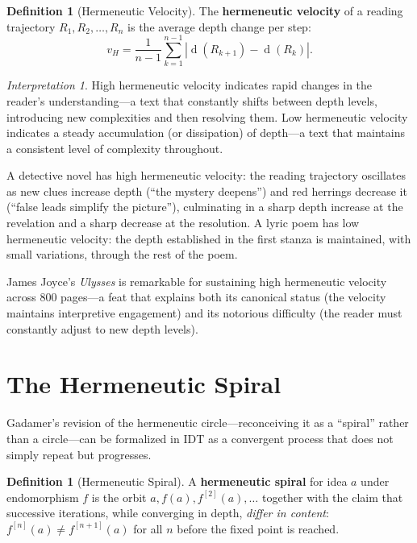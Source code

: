 \documentclass[11pt,openany]{book}
\theoremstyle{definition}
\newtheorem{definition}[axiom]{Definition}
\theoremstyle{plain}
\theoremstyle{remark}
\newtheorem{interpretation}[axiom]{Interpretation}
\newcommand{\depth}{\operatorname{d}}       %
\begin{document}
\begin{definition}[Hermeneutic Velocity]
The \textbf{hermeneutic velocity} of a reading trajectory $R_1, R_2, \ldots, R_n$ is the average depth change per step:
\[
v_H = \frac{1}{n-1} \sum_{k=1}^{n-1} |\depth(R_{k+1}) - \depth(R_k)|.
\]
\end{definition}

\begin{interpretation}
High hermeneutic velocity indicates rapid changes in the reader's understanding---a text that constantly shifts between depth levels, introducing new complexities and then resolving them. Low hermeneutic velocity indicates a steady accumulation (or dissipation) of depth---a text that maintains a consistent level of complexity throughout.

A detective novel has high hermeneutic velocity: the reading trajectory oscillates as new clues increase depth (``the mystery deepens'') and red herrings decrease it (``false leads simplify the picture''), culminating in a sharp depth increase at the revelation and a sharp decrease at the resolution. A lyric poem has low hermeneutic velocity: the depth established in the first stanza is maintained, with small variations, through the rest of the poem.

James Joyce's \emph{Ulysses} is remarkable for sustaining high hermeneutic velocity across 800 pages---a feat that explains both its canonical status (the velocity maintains interpretive engagement) and its notorious difficulty (the reader must constantly adjust to new depth levels).
\end{interpretation}

\section{The Hermeneutic Spiral}

Gadamer's revision of the hermeneutic circle---reconceiving it as a ``spiral'' rather than a circle---can be formalized in IDT as a convergent process that does not simply repeat but progresses.

\begin{definition}[Hermeneutic Spiral]
A \textbf{hermeneutic spiral} for idea $a$ under endomorphism $f$ is the orbit $a, f(a), f^{[2]}(a), \ldots$ together with the claim that successive iterations, while converging in depth, \emph{differ in content}: $f^{[n]}(a) \neq f^{[n+1]}(a)$ for all $n$ before the fixed point is reached.
\end{definition}
\end{document}
